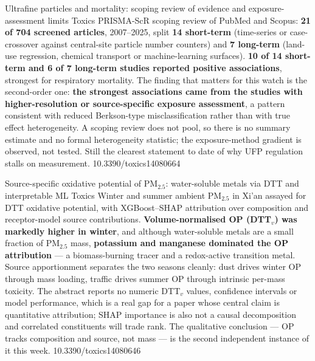 \documentclass[10pt]{article}
\begin{document}

{Ultrafine particles and mortality: scoping review of evidence and exposure-assessment limits}
{Toxics}
{PRISMA-ScR scoping review of PubMed and Scopus: \textbf{21 of 704 screened articles},
2007--2025, split \textbf{14 short-term} (time-series or case-crossover against central-site
particle number counters) and \textbf{7 long-term} (land-use regression, chemical transport
or machine-learning surfaces). \textbf{10 of 14 short-term and 6 of 7 long-term studies
reported positive associations}, strongest for respiratory mortality. The finding that
matters for this watch is the second-order one: \textbf{the strongest associations came
from the studies with higher-resolution or source-specific exposure assessment}, a pattern
consistent with reduced Berkson-type misclassification rather than with true effect
heterogeneity. A scoping review does not pool, so there is no summary estimate and no
formal heterogeneity statistic; the exposure-method gradient is observed, not tested.
Still the clearest statement to date of why UFP regulation stalls on measurement.}
{10.3390/toxics14080664}

{Source-specific oxidative potential of PM$_{2.5}$: water-soluble metals via DTT and interpretable ML}
{Toxics}
{Winter and summer ambient PM$_{2.5}$ in Xi'an assayed for DTT oxidative potential, with
XGBoost--SHAP attribution over composition and receptor-model source contributions.
\textbf{Volume-normalised OP (DTT$_v$) was markedly higher in winter}, and although
water-soluble metals are a small fraction of PM$_{2.5}$ mass, \textbf{potassium and
manganese dominated the OP attribution} --- a biomass-burning tracer and a redox-active
transition metal. Source apportionment separates the two seasons cleanly: dust drives
winter OP through mass loading, traffic drives summer OP through intrinsic per-mass
toxicity. The abstract reports no numeric DTT$_v$ values, confidence intervals or model
performance, which is a real gap for a paper whose central claim is quantitative
attribution; SHAP importance is also not a causal decomposition and correlated
constituents will trade rank. The qualitative conclusion --- OP tracks composition and
source, not mass --- is the second independent instance of it this week.}
{10.3390/toxics14080646}
\end{document}
